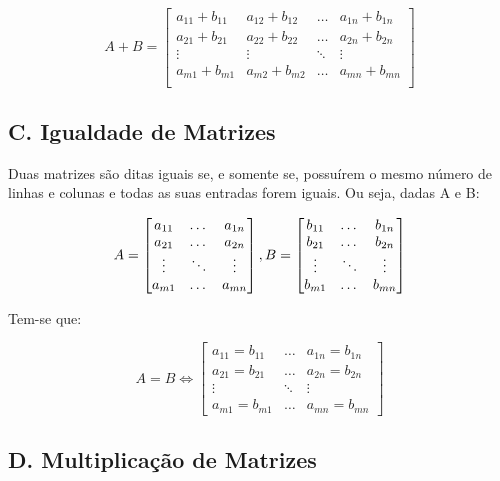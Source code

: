 \documentclass[twocolumn, 10pt,a4paper]{extarticle}
\begin{document}
\[
A+B=
\left[
\begin{smallmatrix}
a_{11} + b_{11} & a_{12} + b_{12} & \dots & a_{1n} + b_{1n} \\
a_{21} + b_{21} & a_{22} + b_{22} & \dots & a_{2n} + b_{2n} \\
\vdots & \vdots & \ddots & \vdots \\
a_{m1} + b_{m1} & a_{m2} + b_{m2} & \dots & a_{mn} + b_{mn}\\
 &  &  &
\end{smallmatrix}\right]
\]

\subsection*{C. \quad Igualdade de Matrizes}

Duas matrizes são ditas iguais se, e somente se, possuírem o mesmo número de linhas e colunas e todas as suas entradas forem iguais. Ou seja, dadas A e B:

\[ 
A = 
\begin{bmatrix}
a_{11} & \dots & a_{1n} \\
a_{21} & \dots & a_{2n} \\
\vdots & \ddots & \vdots \\
a_{m1} & \dots & a_{mn} 

\end{bmatrix},  \\ 
B = 
\begin{bmatrix}
b_{11}  & \dots & b_{1n} \\
b_{21}  & \dots & b_{2n} \\
\vdots  & \ddots & \vdots \\
b_{m1}  & \dots & b_{mn} 

\end{bmatrix}
\]

Tem-se que:

\[ 
A = B \iff
\begin{bmatrix}
a_{11} = b_{11}  & \dots & a_{1n} = b_{1n} \\
a_{21} = b_{21}  & \dots & a_{2n} = b_{2n} \\
\vdots & \ddots  & \vdots \\
a_{m1} = b_{m1}  & \dots & a_{mn} = b_{mn} 

\end{bmatrix}
\]

\subsection*{D. \quad Multiplicação de Matrizes}
\end{document}
